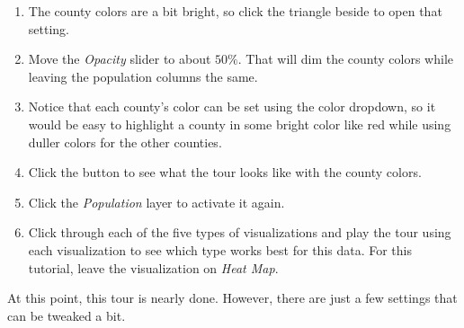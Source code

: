 \begin{enumerate}[resume]
	\item The county colors are a bit bright, so click the triangle beside  to open that setting.
	\item Move the \textit{Opacity} slider to about $ 50\% $. That will dim the county colors while leaving the population columns the same.
	\item Notice that each county's color can be set using the color dropdown, so it would be easy to highlight a county in some bright color like red while using duller colors for the other counties.
	\item Click the  button to see what the tour looks like with the county colors.
	\item Click the \textit{Population} layer to activate it again.
	\item Click through each of the five types of visualizations and play the tour using each visualization to see which type works best for this data. For this tutorial, leave the visualization on \textit{Heat Map}.
\end{enumerate}

At this point, this tour is nearly done. However, there are just a few settings that can be tweaked a bit.

